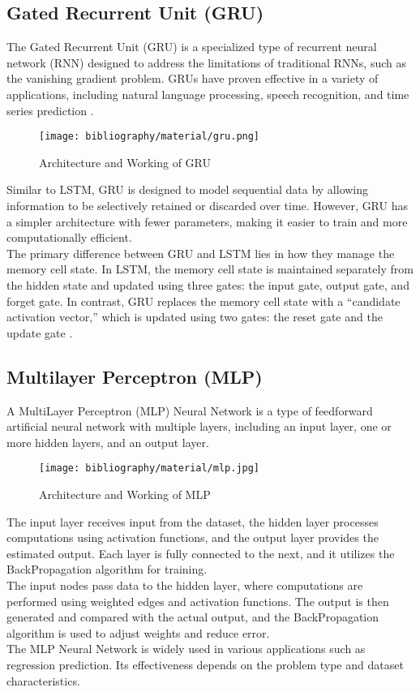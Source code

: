 \documentclass{ieeeojies}
\begin{document}
	\subsection{Gated Recurrent Unit (GRU)}
	The Gated Recurrent Unit (GRU) is a specialized type of recurrent neural network (RNN) designed to address the limitations of traditional RNNs, such as the vanishing gradient problem. GRUs have proven effective in a variety of applications, including natural language processing, speech recognition, and time series prediction \cite{b15}.
	\begin{figure}[H] %
		\centering
		\texttt{[image: bibliography/material/gru.png]}
		\caption{Architecture and Working of GRU}
	\end{figure}
	\noindent Similar to LSTM, GRU is designed to model sequential data by allowing information to be selectively retained or discarded over time. However, GRU has a simpler architecture with fewer parameters, making it easier to train and more computationally efficient.\\
	The primary difference between GRU and LSTM lies in how they manage the memory cell state. In LSTM, the memory cell state is maintained separately from the hidden state and updated using three gates: the input gate, output gate, and forget gate. In contrast, GRU replaces the memory cell state with a “candidate activation vector,” which is updated using two gates: the reset gate and the update gate \cite{b16}.
	
	\subsection{Multilayer Perceptron (MLP)}
	A MultiLayer Perceptron (MLP) Neural Network is a type of feedforward artificial neural network with multiple layers, including an input layer, one or more hidden layers, and an output layer.\\
	\begin{figure}[H] %
		\centering
		\texttt{[image: bibliography/material/mlp.jpg]}
		\caption{Architecture and Working of MLP}
	\end{figure}
	The input layer receives input from the dataset, the hidden layer processes computations using activation functions, and the output layer provides the estimated output. Each layer is fully connected to the next, and it utilizes the BackPropagation algorithm for training.\\
	The input nodes pass data to the hidden layer, where computations are performed using weighted edges and activation functions. The output is then generated and compared with the actual output, and the BackPropagation algorithm is used to adjust weights and reduce error. \\
	The MLP Neural Network is widely used in various applications such as regression prediction. Its effectiveness depends on the problem type and dataset characteristics. \cite{b17} \\
	
\end{document}
